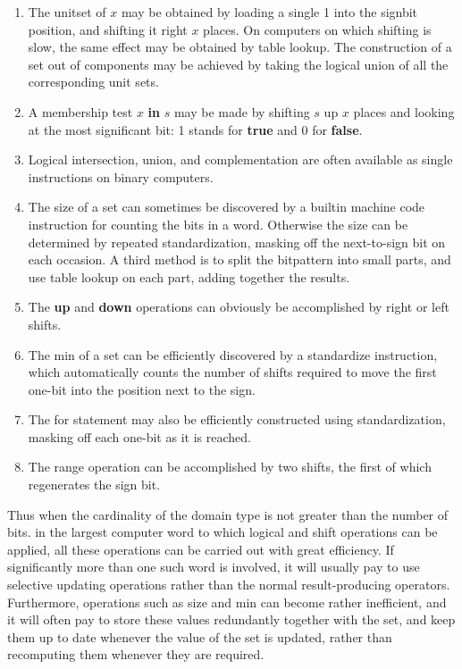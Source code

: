 \documentclass[twoside,11pt]{book}
\begin{document}
\begin{enumerate}[wide, nosep, label=(\arabic*)]
	\item The unitset of $x$ may be obtained by loading a single 1 into the signbit position, and shifting it right $x$ places. On computers on which shifting is slow, the same effect may be obtained by table lookup. The construction of a set out of components may be achieved by taking the logical union of all the corresponding unit sets.

	\item A membership test $x$ \textbf{in} $s$ may be made by shifting $s$ up $x$ places and looking at the most significant bit: 1 stands for \textbf{true} and 0 for \textbf{false}.

	\item Logical intersection, union, and complementation are often available as single instructions on binary computers.

	\item The size of a set can sometimes be discovered by a builtin machine code instruction for counting the bits in a word. Otherwise the size can be determined by repeated standardization, masking off the next-to-sign bit on each occasion. A third method is to split the bitpattern into small parts, and use table lookup on each part, adding together the results.

	\item The \textbf{up} and \textbf{down} operations can obviously be accomplished by right or left shifts.

	\item The min of a set can be efficiently discovered by a standardize instruction, which automatically counts the number of shifts required to move the first one-bit into the position next to the sign.

	\item The for statement may also be efficiently constructed using standardization, masking off each one-bit as it is reached.

	\item The range operation can be accomplished by two shifts, the first of which regenerates the sign bit.	
\end{enumerate}

Thus when the cardinality of the domain type is not greater than the number of bits. in the largest computer word to which logical and shift operations can be applied, all these operations can be carried out with great efficiency. If significantly more than one such word is involved, it will usually pay to use selective updating operations rather than the normal result-producing operators. Furthermore, operations such as size and min can become rather inefficient, and it will often pay to store these values redundantly together with the set, and keep them up to date whenever the value of the set is updated, rather than recomputing them whenever they are required.
\end{document}
